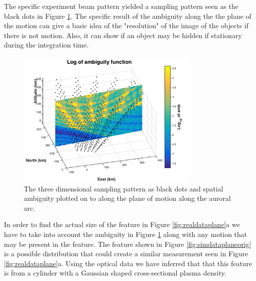 
The specific experiment beam pattern yielded a sampling pattern seen as the black dots in Figure \ref{fig:rambplane}. The specific result of the ambiguity along the the plane of the motion can give a basic idea of the "resolution" of the image of the objects if there is not motion. Also, it can show if an object may be hidden if stationary during the integration time.

\begin{figure}[h!]
	\centering
	\includegraphics[width=3.5in]{ambplane}
	\caption{The three dimensional sampling pattern as black dots and spatial ambiguity plotted on to along the plane of motion along the auroral arc.}
	\label{fig:rambplane}
\end{figure}

In order to find the actual size of the feature in Figure \ref{fig:realdataplane}a we have to take into account the ambiguity in Figure \ref{fig:rambplane}  along with any motion that may be present in the feature. The feature shown in Figure \ref{fig:simdataplaneorig} is a possible distribution that could create a similar measurement seen in Figure  \ref{fig:realdataplane}a. Using the optical data we have inferred that that this feature is from a cylinder with a Gaussian shaped cross-sectional plasma density. 

